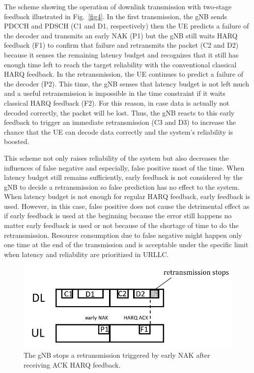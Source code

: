 \documentclass[conference]{IEEEtran}
\begin{document}
The scheme showing the operation of downlink transmission with two-stage feedback illustrated in Fig.~\ref{fig4}. In the first transmission, the gNB sends PDCCH and PDSCH (C1 and D1, respectively) then the UE predicts a failure of the decoder and transmits an early NAK (P1) but the gNB still waits HARQ feedback (F1) to confirm that failure and retransmits the packet (C2 and D2) because it senses the remaining latency budget and recognizes that it still has enough time left to reach the target reliability with the conventional classical HARQ feedback. In the retransmission, the UE continues to predict a failure of the decoder (P2). This time, the gNB senses that latency budget is not left much and a useful retransmission is impossible in the time constraint if it waits classical HARQ feedback (F2). For this reason, in case data is actually not decoded correctly, the packet will be lost. Thus, the gNB reacts to this early feedback to trigger an immediate retransmission (C3 and D3) to increase the chance that the UE can decode data correctly and the system's reliability is boosted.

This scheme not only raises reliability of the system but also decreases the influences of false negative and especially, false positive most of the time. When latency budget still remains sufficiently, early feedback is not considered by the gNB to decide a retransmission so false prediction has no effect to the system. When latency budget is not enough for regular HARQ feedback, early feedback is used. However, in this case, false positive does not cause the detrimental effect as if early feedback is used at the beginning because the error still happens no matter early feedback is used or not because of the shortage of time to do the retransmission. Resource consumption due to false negative might happen only one time at the end of the transmission and is acceptable under the specific limit when latency and reliability are prioritized in URLLC.

\begin{figure}[htbp]
\centerline{\includegraphics[scale=0.37]{fig5.png}}
\caption{The gNB stops a retransmission triggered by early NAK after receiving ACK HARQ feedback.}
\label{fig5}
\end{figure}
\end{document}
